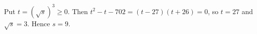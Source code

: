 Put $t=(\sqrt s)^3\ge0$. Then $t^2-t-702=(t-27)(t+26)=0$, so $t=27$ and $\sqrt s=3$. Hence $\boxed{s=9}$.
